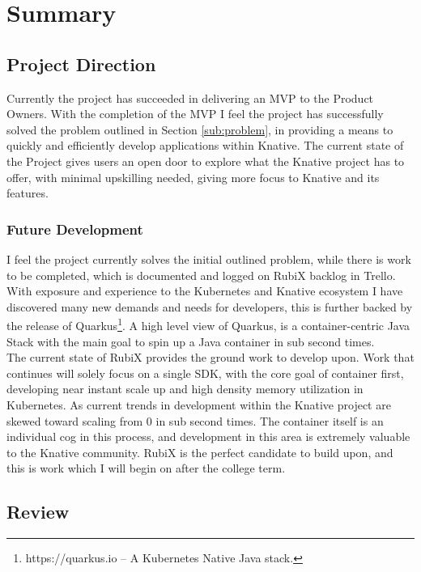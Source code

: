 \section{Summary}

\subsection{Project Direction}
Currently the project has succeeded in delivering an MVP to the Product Owners. With the completion of the MVP I feel the project has successfully solved the problem outlined in Section \ref{sub:problem}, in providing a means to quickly and efficiently develop applications within Knative. The current state of the Project gives users an open door to explore what the Knative project has to offer, with minimal upskilling needed, giving more focus to Knative and its features.
\subsubsection{Future Development}
I feel the project currently solves the initial outlined problem, while there is work to be completed, which is documented and logged on RubiX backlog in Trello. With exposure and experience to the Kubernetes and Knative ecosystem I have discovered many new demands and needs for developers, this is further backed by the release of Quarkus\footnote{https://quarkus.io -- A Kubernetes Native Java stack.}. A high level view of Quarkus, is a container-centric Java Stack with the main goal to spin up a Java container in sub second times. 
\\The current state of RubiX provides the ground work to develop upon. Work that continues will solely focus on a single SDK, with the core goal of container first, developing near instant scale up and high density memory utilization in Kubernetes. As current trends in development within the Knative project are skewed toward scaling from 0 in sub second times. The container itself is an individual cog in this process, and development in this area is extremely valuable to the Knative community. RubiX is the perfect candidate to build upon, and this is work which I will begin on after the college term.
\subsection{Review}
